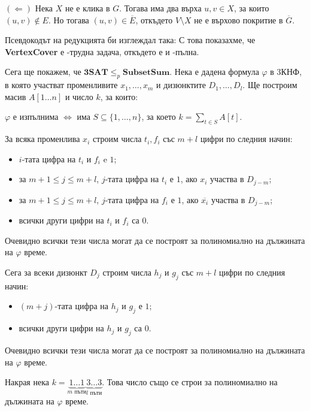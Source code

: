 $(\Leftarrow)$
Нека $X$ не е клика в $G$.
Тогава има два върха $u, v \in X$, за които $(u, v) \notin E$.
Но тогава $(u, v) \in \overline{E}$, откъдето $V \setminus X$ не е върхово покритие в $\overline{G}$.

Псевдокодът на редукцията би изглеждал така:
С това показахме, че \textbf{VertexCover} е \NP-трудна задача, откъдето е и \NP-пълна.

Сега ще покажем, че $\mathbf{3SAT} \leq_p \mathbf{SubsetSum}$.
Нека е дадена формула $\varphi$ в 3КНФ, в която участват променливите $x_1, \dots, x_m$ и дизюнктите $D_1, \dots, D_l$.
Ще построим масив $A[1 \dots n]$ и число $k$, за които:
\begin{center}
    $\varphi$ е изпълнима $\iff$ има $S \subseteq \{ 1, \dots, n \}$, за което $k = \sum\limits_{t \in S} A[t]$.
\end{center}
За всяка променлива $x_i$ строим числа $t_i, f_i$ със $m + l$ цифри по следния начин:
\begin{itemize}
    \item $i$-тата цифра на $t_i$ и $f_i$ e $1$;
    \item за $m + 1 \leq j \leq m + l$, $j$-тата цифра на $t_i$ е $1$, ако $x_i$ участва в $D_{j - m}$;
    \item за $m + 1 \leq j \leq m + l$, $j$-тата цифра на $f_i$ е $1$, ако $\overline{x_i}$ участва в $D_{j - m}$;
    \item всички други цифри на $t_i$ и $f_i$ са $0$.
\end{itemize}
Очевидно всички тези числа могат да се построят за полиномиално на дължината на $\varphi$ време.

Сега за всеки дизюнкт $D_j$ строим числа $h_j$ и $g_j$ със $m + l$ цифри по следния начин:
\begin{itemize}
    \item $(m + j)$-тата цифра на $h_j$ и $g_j$ е $1$;
    \item всички други цифри на $h_j$ и $g_j$ са $0$.
\end{itemize}

\newpage
Очевидно всички тези числа могат да се построят за полиномиално на дължината на $\varphi$ време.

Накрая нека $k = \underbrace{1 \dots 1}_{m \text{ пъти}} \underbrace{3 \dots 3}_{l \text{ пъти}}$.
Това число също се строи за полиномиално на дължината на $\varphi$ време.

